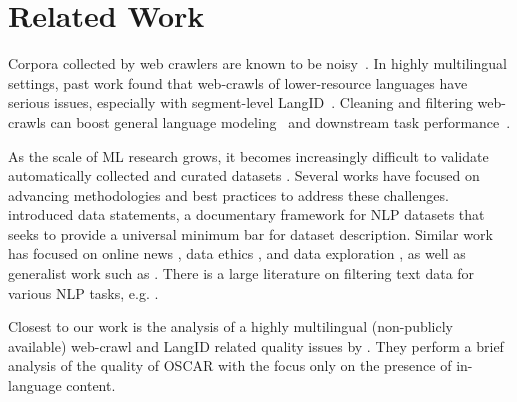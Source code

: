 \section{Related Work}\label{sec:related}

Corpora collected by web crawlers are known to be noisy~\citep{junczys-dowmunt-2019-microsoft}. In highly multilingual settings, past work found that web-crawls of lower-resource languages have serious issues, especially with segment-level LangID~\citep{caswell-etal-2020-language}.
Cleaning and filtering web-crawls can boost general language modeling~\citep{gao-etal-2020-the,brown-etal-2020-language,raffel-etal-2020-exploring} and downstream task performance~\citep{moore-lewis-2010-intelligent,xu-koehn-2017-zipporah,khayrallah-koehn-2018-impact,brown-etal-2020-language}.

As the scale of ML research grows, it becomes increasingly difficult to validate automatically collected and curated datasets \citep{biderman-etal-2020-pitfalls,birhane-etal-2021-large,bender-etal-2021-on}.
Several works have focused on advancing methodologies and best practices to address these challenges. \citet{bender-friedman-2018-data} introduced data statements, a documentary framework for NLP datasets that seeks to provide a universal minimum bar for dataset description. Similar work has focused on
online news \citep{kevin-etal-2018-information}, data ethics \citep{sun-etal-2019-mithralabel}, and data exploration \citep{holland-etal-2018-the}, as well as generalist work such as \citep{gebru-etal-2018-datasheets}. There is a large literature on filtering text data for various NLP tasks, e.g. \cite{axelrod-etal-2011-domain,moore-lewis-2010-intelligent,wang-etal-2018-denoising,kamholz-etal-2014-panlex,junczys-dowmunt-2018-dual,caswell-etal-2020-language}.

Closest to our work is the analysis of a highly multilingual (non-publicly available) web-crawl and LangID related quality issues by \citet{caswell-etal-2020-language}.
They perform a brief analysis of the quality of OSCAR
with the focus only on the presence of in-language content.

